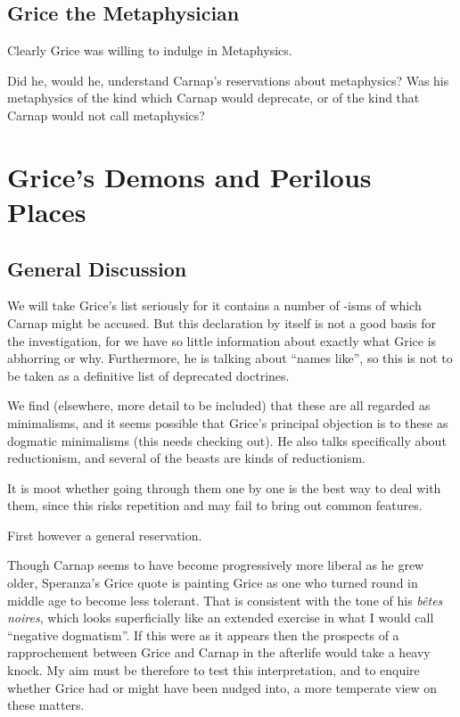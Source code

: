 \documentclass[10pt,titlepage]{book}
\begin{document}
\subsection{Grice the Metaphysician}

Clearly Grice was willing to indulge in Metaphysics.

Did he, would he, understand Carnap's reservations about metaphysics?
Was his metaphysics of the kind which Carnap would deprecate, or of the kind that Carnap would not call metaphysics?


\section{Grice's Demons and Perilous Places}


\subsection{General Discussion}

We will take Grice's list seriously for it contains a number of -isms of which Carnap might be accused.
But this declaration by itself is not a good basis for the investigation, for we have so little information about exactly what Grice is abhorring or why.
Furthermore, he is talking about ``names like'', so this is not to be taken as a definitive list of deprecated doctrines.

We find (elsewhere, more detail to be included) that these are all regarded as minimalisms, and it seems possible that Grice's principal objection is to these as dogmatic minimalisms (this needs checking out).
He also talks specifically about reductionism, and several of the beasts are kinds of reductionism.

It is moot whether going through them one by one is the best way to deal with them, since this risks repetition and may fail to bring out common features.

First however a general reservation.

Though Carnap seems to have become progressively more liberal as he grew older, Speranza's Grice quote is painting Grice as one who turned round in middle age to become less tolerant.
That is consistent with the tone of his {\it b\^etes noires}, which looks superficially like an extended exercise in what I would call ``negative dogmatism''.
If this were as it appears then the prospects of a rapprochement between Grice and Carnap in the afterlife would take a heavy knock.
My aim must be therefore to test this interpretation, and to enquire whether Grice had or might have been nudged into, a more temperate view on these matters. 
\end{document}
